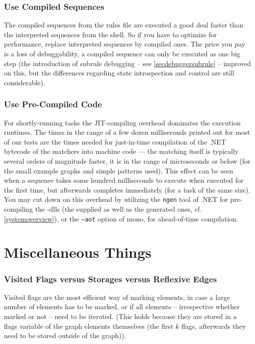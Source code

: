 \subsubsection*{Use Compiled Sequences}
The compiled sequences from the rules file are executed a good deal faster than the interpreted sequences from the shell.
So if you have to optimize for performance, replace interpreted sequences by compiled ones.
The price you pay is a loss of debuggability, a compiled sequence can only be executed as one big step 
(the introduction of subrule debugging -- see \ref{secdebuggersubrule} -- improved on this, but the differences regarding state introspection and control are still considerable).

\subsubsection*{Use Pre-Compiled Code}
For shortly-running tasks the JIT-compiling overhead dominates the execution runtimes.
The times in the range of a few dozen milliseconds printed out for most of our tests are the times needed for just-in-time compilation of the .NET bytecode of the matchers into machine code --- the matching itself is typically several orders of magnitude faster, it is in the range of microseconds or below (for the small example graphs and simple patterns used).
This effect can be seen when a sequence takes some hundred milliseconds to execute when executed for the first time, but afterwards completes immediately (for a task of the same size).
You may cut down on this overhead by utilizing the \texttt{ngen} tool of .NET for pre-compiling the \GrG-dlls (the supplied as well as the generated ones, cf. \ref{systemoverview}), or the \texttt{--aot} option of mono, for ahead-of-time compilation.


\section{Miscellaneous Things}

\subsubsection*{Visited Flags versus Storages versus Reflexive Edges}
Visited flags are the most efficient way of marking elements, in case a large number of elements has to be marked, or if all elements -- irrespective whether marked or not -- need to be iterated.
(This holds because they are stored in a flags variable of the graph elements themselves (the first $k$ flags, afterwards they need to be stored outside of the graph)).

